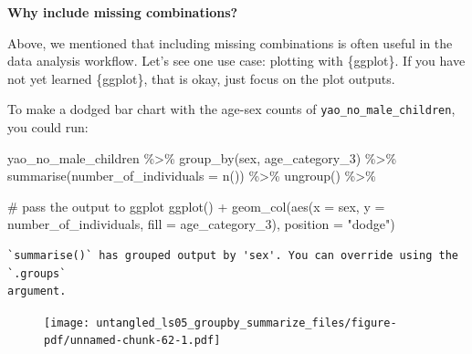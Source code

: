 \documentclass[
  letterpaper,
  DIV=11,
  numbers=noendperiod]{scrreprt}
\newenvironment{Shaded}{\begin{snugshade}}{\end{snugshade}}
\newcommand{\AttributeTok}[1]{\textcolor[rgb]{0.40,0.45,0.13}{#1}}
\newcommand{\CommentTok}[1]{\textcolor[rgb]{0.37,0.37,0.37}{#1}}
\newcommand{\FunctionTok}[1]{\textcolor[rgb]{0.28,0.35,0.67}{#1}}
\newcommand{\NormalTok}[1]{\textcolor[rgb]{0.00,0.23,0.31}{#1}}
\newcommand{\SpecialCharTok}[1]{\textcolor[rgb]{0.37,0.37,0.37}{#1}}
\newcommand{\StringTok}[1]{\textcolor[rgb]{0.13,0.47,0.30}{#1}}
\begin{document}
\begin{tcolorbox}[enhanced jigsaw, colframe=quarto-callout-note-color-frame, rightrule=.15mm, opacityback=0, breakable, coltitle=black, colbacktitle=quarto-callout-note-color!10!white, bottomrule=.15mm, leftrule=.75mm, toprule=.15mm, arc=.35mm, bottomtitle=1mm, colback=white, left=2mm, opacitybacktitle=0.6, titlerule=0mm, title=\textcolor{quarto-callout-note-color}{\faInfo}\hspace{0.5em}{Side Note}, toptitle=1mm]

\textbf{Why include missing combinations?}

Above, we mentioned that including missing combinations is often useful
in the data analysis workflow. Let's see one use case: plotting with
\{ggplot\}. If you have not yet learned \{ggplot\}, that is okay, just
focus on the plot outputs.

To make a dodged bar chart with the age-sex counts of
\texttt{yao\_no\_male\_children}, you could run:

\begin{Shaded}
\begin{Highlighting}[]
\NormalTok{yao\_no\_male\_children }\SpecialCharTok{\%\textgreater{}\%} 
  \FunctionTok{group\_by}\NormalTok{(sex, age\_category\_3) }\SpecialCharTok{\%\textgreater{}\%} 
  \FunctionTok{summarise}\NormalTok{(}\AttributeTok{number\_of\_individuals =} \FunctionTok{n}\NormalTok{()) }\SpecialCharTok{\%\textgreater{}\%} 
  \FunctionTok{ungroup}\NormalTok{() }\SpecialCharTok{\%\textgreater{}\%} 
  
  \CommentTok{\# pass the output to ggplot}
  \FunctionTok{ggplot}\NormalTok{() }\SpecialCharTok{+} 
  \FunctionTok{geom\_col}\NormalTok{(}\FunctionTok{aes}\NormalTok{(}\AttributeTok{x =}\NormalTok{ sex, }\AttributeTok{y =}\NormalTok{ number\_of\_individuals, }\AttributeTok{fill =}\NormalTok{ age\_category\_3), }
           \AttributeTok{position =} \StringTok{"dodge"}\NormalTok{)}
\end{Highlighting}
\end{Shaded}

\begin{verbatim}
`summarise()` has grouped output by 'sex'. You can override using the `.groups`
argument.
\end{verbatim}

\begin{figure}[H]

{\centering \texttt{[image: untangled\_ls05\_groupby\_summarize\_files/figure-pdf/unnamed-chunk-62-1.pdf]}

}
\end{figure}
\end{tcolorbox}
\end{document}
